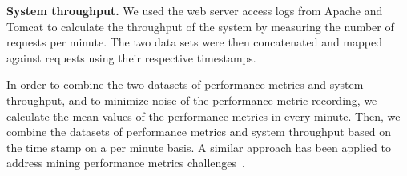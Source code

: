 \noindent \textbf{System throughput.} We used the web server access logs from Apache and Tomcat to calculate the throughput of the system by measuring the number of requests per minute. The two data sets were then concatenated and mapped against requests using their respective timestamps.

In order to combine the two datasets of performance metrics and system throughput, and to minimize noise of the performance metric recording, we calculate the mean values of the performance metrics in every minute. Then, we combine the datasets of performance metrics and system throughput based on the time stamp on a per minute basis. A similar approach has been applied to address mining performance metrics challenges~\cite{foo2010mining}.
